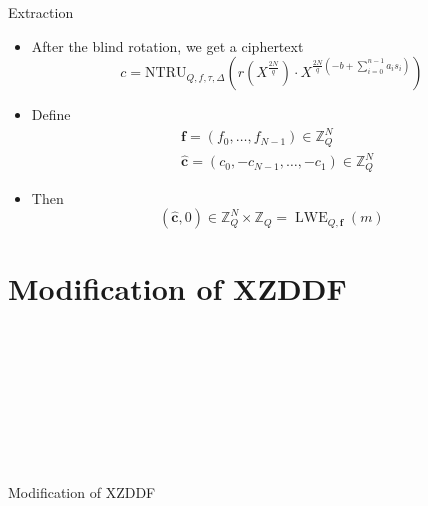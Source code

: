 \documentclass[aspectratio=169]{beamer}
\begin{document}
\begin{frame}{Extraction}
    \begin{itemize}
        \item After the blind rotation, we get a ciphertext 
            $$c = \mathrm{NTRU}_{Q, f, \tau, \Delta}\left(r(X^{\frac{2N}{q}}) \cdot X^{\frac{2N}{q} (-b  + \sum_{i=0}^{n-1}a_is_i)}\right)$$
    \end{itemize}
    \begin{itemize}
        \item Define
        \begin{align*}
            &\mathbf{f} = (f_0, \ldots, f_{N-1}) \in \mathbb{Z}_Q^N \\
            &\hat{\mathbf{c}} = (c_0, -c_{N-1}, \ldots, -c_1) \in \mathbb{Z}_Q^N
        \end{align*}
    \end{itemize}
    \begin{itemize}
        \item Then $$(\hat{\mathbf{c}}, 0) \in \mathbb{Z}_Q^N \times \mathbb{Z}_Q = \operatorname{LWE}_{Q,\mathbf{f}}(m)$$
    \end{itemize}
\end{frame}

\section{Modification of XZDDF}

\begin{frame}{\\~\\~\\~\\~\\~\\~\\~\\ \huge \text{\;\;\;\;\;\;\;\;} Modification of XZDDF}
\end{frame}
\end{document}
